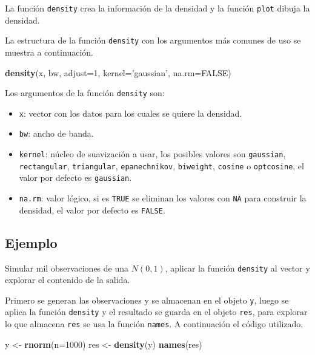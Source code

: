\documentclass[10pt,]{krantz}
\makeatletter
\newenvironment{Shaded}{\begin{snugshade}}{\end{snugshade}}
\newcommand{\KeywordTok}[1]{\textcolor[rgb]{0.13,0.29,0.53}{\textbf{{#1}}}}
\newcommand{\DataTypeTok}[1]{\textcolor[rgb]{0.13,0.29,0.53}{{#1}}}
\newcommand{\DecValTok}[1]{\textcolor[rgb]{0.00,0.00,0.81}{{#1}}}
\newcommand{\StringTok}[1]{\textcolor[rgb]{0.31,0.60,0.02}{{#1}}}
\newcommand{\OtherTok}[1]{\textcolor[rgb]{0.56,0.35,0.01}{{#1}}}
\newcommand{\NormalTok}[1]{{#1}}
\providecommand{\tightlist}{%
  \setlength{\itemsep}{0pt}\setlength{\parskip}{0pt}}
\newenvironment{kframe}{%
\medskip{}
\setlength{\fboxsep}{.8em}
 \def\at@end@of@kframe{}%
 \ifinner\ifhmode%
  \def\at@end@of@kframe{\end{minipage}}%
  \begin{minipage}{\columnwidth}%
 \fi\fi%
 \def\FrameCommand##1{\hskip\@totalleftmargin \hskip-\fboxsep
 \colorbox{shadecolor}{##1}\hskip-\fboxsep
     \hskip-\linewidth \hskip-\@totalleftmargin \hskip\columnwidth}%
 \MakeFramed {\advance\hsize-\width
   \@totalleftmargin\z@ \linewidth\hsize
   \@setminipage}}%
 {\par\unskip\endMakeFramed%
 \at@end@of@kframe}
\renewenvironment{Shaded}{\begin{kframe}}{\end{kframe}}
\makeatother
\begin{document}
La función \texttt{density} crea la información de la densidad y la
función \texttt{plot} dibuja la densidad.

La estructura de la función \texttt{density} con los argumentos más
comunes de uso se muestra a continuación.

\begin{Shaded}
\begin{Highlighting}[]
\KeywordTok{density}\NormalTok{(x, bw, }\DataTypeTok{adjust=}\DecValTok{1}\NormalTok{, }\DataTypeTok{kernel=}\StringTok{'gaussian'}\NormalTok{, }\DataTypeTok{na.rm=}\OtherTok{FALSE}\NormalTok{)}
\end{Highlighting}
\end{Shaded}

Los argumentos de la función \texttt{density} son:

\begin{itemize}
\tightlist
\item
  \texttt{x}: vector con los datos para los cuales se quiere la
  densidad.
\item
  \texttt{bw}: ancho de banda.
\item
  \texttt{kernel}: núcleo de suavización a usar, los posibles valores
  son \texttt{gaussian}, \texttt{rectangular}, \texttt{triangular},
  \texttt{epanechnikov}, \texttt{biweight}, \texttt{cosine} o
  \texttt{optcosine}, el valor por defecto es \texttt{gaussian}.
\item
  \texttt{na.rm}: valor lógico, si es \texttt{TRUE} se eliminan los
  valores con \texttt{NA} para construir la densidad, el valor por
  defecto es \texttt{FALSE}.
\end{itemize}

\subsection*{Ejemplo}\label{ejemplo-5}


Simular mil observaciones de una \(N(0, 1)\), aplicar la función
\texttt{density} al vector y explorar el contenido de la salida.

Primero se generan las observaciones y se almacenan en el objeto
\texttt{y}, luego se aplica la función \texttt{density} y el resultado
se guarda en el objeto \texttt{res}, para explorar lo que almacena
\texttt{res} se usa la función \texttt{names}. A continuación el código
utilizado.

\begin{Shaded}
\begin{Highlighting}[]
\NormalTok{y <-}\StringTok{ }\KeywordTok{rnorm}\NormalTok{(}\DataTypeTok{n=}\DecValTok{1000}\NormalTok{)}
\NormalTok{res <-}\StringTok{ }\KeywordTok{density}\NormalTok{(y)}
\KeywordTok{names}\NormalTok{(res)}
\end{Highlighting}
\end{Shaded}
\end{document}
